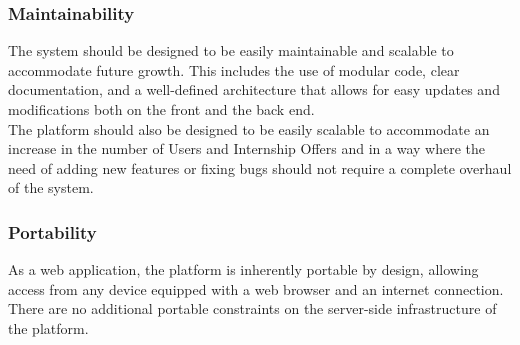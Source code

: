 \subsubsection{Maintainability}
The system should be designed to be easily maintainable and scalable to accommodate future growth. This includes the use of modular code, clear documentation, and a well-defined architecture that allows for easy updates and modifications both on the front and the back end. \\
The platform should also be designed to be easily scalable to accommodate an increase in the number of Users and Internship Offers and in a way where the need of adding new features or fixing bugs should not require a complete overhaul of the system.\\
\subsubsection{Portability}
As a web application, the platform is inherently portable by design, allowing access from any device equipped with a web browser and an internet connection. There are no additional portable constraints on the server-side infrastructure of the platform.